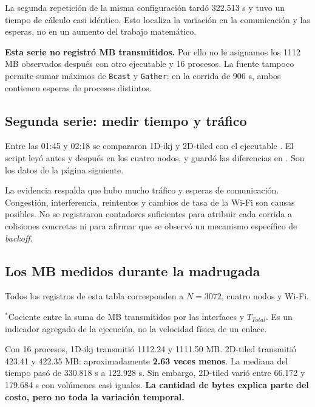 La segunda repetición de la misma configuración tardó 322.513 s y tuvo un tiempo de cálculo casi idéntico. Esto localiza la variación en la comunicación y las esperas, no en un aumento del trabajo matemático.

\textbf{Esta serie no registró MB transmitidos.} Por ello no le asignamos los 1112 MB observados después con otro ejecutable y 16 procesos. La fuente tampoco permite sumar máximos de \texttt{Bcast} y \texttt{Gather}: en la corrida de 906 s, ambos contienen esperas de procesos distintos.

\subsection{Segunda serie: medir tiempo y tráfico}
Entre las 01:45 y 02:18 se compararon 1D-ikj y 2D-tiled con el ejecutable . El script leyó  antes y después en los cuatro nodos, y guardó las diferencias en . Son los datos de la página siguiente.

\begin{idea}
La evidencia respalda que hubo mucho tráfico y esperas de comunicación. Congestión, interferencia, reintentos y cambios de tasa de la Wi-Fi son causas posibles. No se registraron contadores suficientes para atribuir cada corrida a colisiones concretas ni para afirmar que se observó un mecanismo específico de \emph{backoff}.
\end{idea}

\subsection{Los MB medidos durante la madrugada}
Todos los registros de esta tabla corresponden a $N=3072$, cuatro nodos y Wi-Fi.

{\small $^{*}$Cociente entre la suma de MB transmitidos por las interfaces y $T_{Total}$. Es un indicador agregado de la ejecución, no la velocidad física de un enlace.}


Con 16 procesos, 1D-ikj transmitió 1112.24 y 1111.50 MB. 2D-tiled transmitió 423.41 y 422.35 MB: aproximadamente \textbf{2.63 veces menos}. La mediana del tiempo pasó de 330.818 s a 122.928 s. Sin embargo, 2D-tiled varió entre 66.172 y 179.684 s con volúmenes casi iguales. \textbf{La cantidad de bytes explica parte del costo, pero no toda la variación temporal.}

